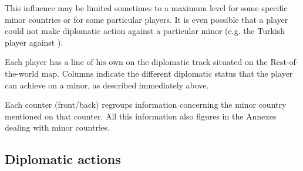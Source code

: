 \aparag[Limit]
This influence may be limited sometimes to a maximum level for some specific
minor countries or for some particular players. It is even possible that a
player could not make diplomatic action against a particular minor (e.g. the
Turkish player against \paysPerse).

Each player has a line of his own on the diplomatic track situated on the
Rest-of-the-world map. Columns indicate the different diplomatic status that
the player can achieve on a minor, as described immediately above.

Each counter (front/back) regroups information concerning the minor country
mentioned on that counter.  All this information also figures in the Annexes
dealing with minor countries.



\subsection{Diplomatic actions}\label{chDiplo:Diplomatic Actions}


